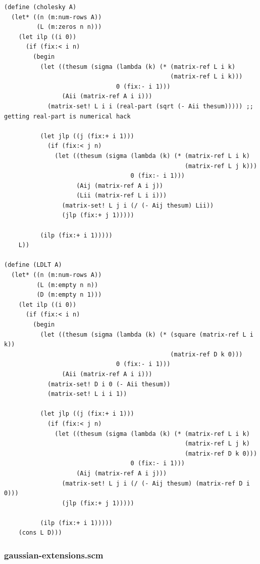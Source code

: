 \documentclass{article}
\begin{document}
\begin{verbatim}
(define (cholesky A)
  (let* ((n (m:num-rows A))
         (L (m:zeros n n)))
    (let ilp ((i 0))
      (if (fix:< i n)
        (begin
          (let ((thesum (sigma (lambda (k) (* (matrix-ref L i k)
                                              (matrix-ref L i k)))
                               0 (fix:- i 1)))
                (Aii (matrix-ref A i i)))
            (matrix-set! L i i (real-part (sqrt (- Aii thesum))))) ;; getting real-part is numerical hack

          (let jlp ((j (fix:+ i 1)))
            (if (fix:< j n)
              (let ((thesum (sigma (lambda (k) (* (matrix-ref L i k)
                                                  (matrix-ref L j k)))
                                   0 (fix:- i 1)))
                    (Aij (matrix-ref A i j))
                    (Lii (matrix-ref L i i)))
                (matrix-set! L j i (/ (- Aij thesum) Lii))
                (jlp (fix:+ j 1)))))

          (ilp (fix:+ i 1)))))
    L))

(define (LDLT A)
  (let* ((n (m:num-rows A))
         (L (m:empty n n))
         (D (m:empty n 1)))
    (let ilp ((i 0))
      (if (fix:< i n)
        (begin
          (let ((thesum (sigma (lambda (k) (* (square (matrix-ref L i k))
                                              (matrix-ref D k 0)))
                               0 (fix:- i 1)))
                (Aii (matrix-ref A i i)))
            (matrix-set! D i 0 (- Aii thesum))
            (matrix-set! L i i 1))

          (let jlp ((j (fix:+ i 1)))
            (if (fix:< j n)
              (let ((thesum (sigma (lambda (k) (* (matrix-ref L i k)
                                                  (matrix-ref L j k)
                                                  (matrix-ref D k 0)))
                                   0 (fix:- i 1)))
                    (Aij (matrix-ref A i j)))
                (matrix-set! L j i (/ (- Aij thesum) (matrix-ref D i 0)))
                (jlp (fix:+ j 1)))))

          (ilp (fix:+ i 1)))))
    (cons L D)))
\end{verbatim}

\subsubsection{gaussian-extensions.scm}
\end{document}
